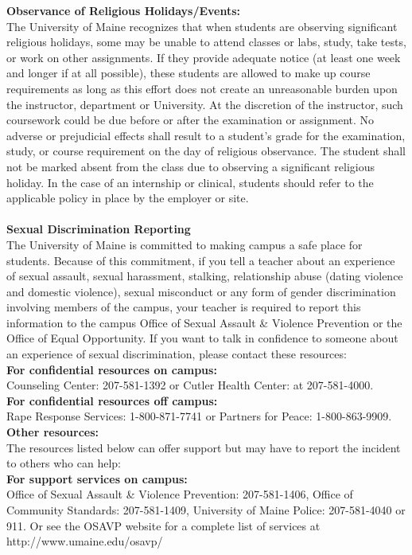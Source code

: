 \documentclass[11pt]{article}
\begin{document}
\textbf{Observance of Religious Holidays/Events:} \\The University of Maine recognizes that when students are observing significant religious holidays, some may be unable to attend classes or labs, study, take tests, or work on other assignments. If they provide adequate notice (at least one week and longer if at all possible), these students are allowed to make up course requirements as long as this effort does not create an unreasonable burden upon the instructor, department or University. At the discretion of the instructor, such coursework could be due before or after the examination or assignment. No adverse or prejudicial effects shall result to a student’s grade for the examination, study, or course requirement on the day of religious observance. The student shall not be marked absent from the class due to observing a significant religious holiday. In the case of an internship or clinical, students should refer to the applicable policy in place by the employer or site.\\~\\ 
\textbf{Sexual Discrimination Reporting}\\ 
The University of Maine is committed to making campus a safe place for students. Because of this commitment, if you tell a teacher about an experience of sexual assault, sexual harassment, stalking, relationship abuse (dating violence and domestic violence), sexual misconduct or any form of gender discrimination involving members of the campus, your teacher is required to report this information to the campus Office of Sexual Assault \& Violence Prevention or the Office of Equal Opportunity. If you want to talk in confidence to someone about an experience of sexual discrimination, please contact these resources:\\
\textbf{For confidential resources on campus:} \\Counseling Center: 207-581-1392 or Cutler Health Center: at 207-581-4000.\\ 
\textbf{For confidential resources off campus:\\}  Rape Response Services: 1-800-871-7741 or Partners for Peace: 1-800-863-9909.\\ 
\textbf{Other resources:} \\ The resources listed below can offer support but may have to report the incident to others who can help:\\ 
\textbf{For support services on campus:}\\ Office of Sexual Assault \& Violence Prevention: 207-581-1406, Office of Community Standards: 207-581-1409, University of Maine Police: 207-581-4040 or 911. Or see the OSAVP website for a complete list of services at http://www.umaine.edu/osavp/
\end{document}
